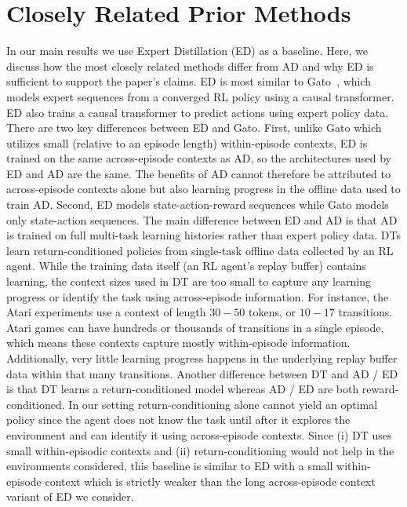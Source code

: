 \documentclass{article}
\theoremstyle{thm}
\newcommand{\name}{AD }
\newcommand{\namenospace}{AD}
\begin{document}
\section{Closely Related Prior Methods}
\label{app:baselines}
In our main results we use Expert Distillation (ED) as a baseline. Here, we discuss how the most closely related methods differ from \name and why ED is sufficient to support the paper's claims.
 ED is most similar to Gato~\citep{reed2022gato}, which models expert sequences from a converged RL policy using a causal transformer. ED also trains a causal transformer to predict actions using expert policy data. There are two key differences between ED and Gato. First, unlike Gato which utilizes small (relative to an episode length) within-episode contexts, ED is trained on the same across-episode contexts as \namenospace, so the architectures used by ED and \name are the same. The benefits of \name cannot therefore be attributed to across-episode contexts alone but also learning progress in the offline data used to train \namenospace. Second, ED models state-action-reward sequences while Gato models only state-action sequences. The main difference between ED and \name is that \name is trained on full multi-task learning histories rather than expert policy data.
 DTs learn return-conditioned policies from single-task offline data collected by an RL agent. While the training data itself (an RL agent's replay buffer) contains learning, the context sizes used in DT are too small to capture any learning progress or identify the task using across-episode information. For instance, the Atari experiments use a context of length $30-50$ tokens, or $10-17$ transitions. Atari games can have hundreds or thousands of transitions in a single episode, which means these contexts capture mostly within-episode information. Additionally, very little learning progress happens in the underlying replay buffer data within that many transitions.
Another difference between DT and \name / ED is that DT learns a return-conditioned model whereas \name / ED are both reward-conditioned. In our setting return-conditioning alone cannot yield an optimal policy since the agent does not know the task until after it explores the environment and can identify it using across-episode contexts. Since (i) DT uses small within-episodic contexts and (ii) return-conditioning would not help in the environments considered, this baseline is similar to ED with a small within-episode context which is strictly weaker than the long across-episode context variant of ED we consider.
\end{document}
